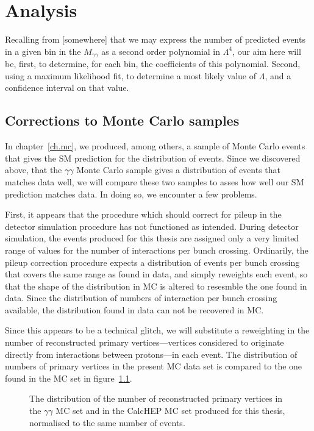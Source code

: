 \chapter{Analysis}\label{ch.an}

Recalling from [somewhere] that we may express the number of predicted events in a given bin in the $M_{\gamma\gamma}$ as a second order polynomial in $\Lambda^4$, our aim here will be, first, to determine, for each bin, the coefficients of this polynomial. Second, using a maximum likelihood fit, to determine a most likely value of $\Lambda$, and a confidence interval on that value.

\section{Corrections to Monte Carlo samples}

In chapter~\ref{ch.mc}, we produced, among others, a sample of Monte Carlo events that gives the SM prediction for the distribution of events. Since we discovered above, that the \atlas{} $\gamma\gamma$ Monte Carlo sample gives a distribution of events that matches data well, we will compare these two samples to asses how well our SM prediction matches data. In doing so, we encounter a few problems.

First, it appears that the procedure which should correct for pileup in the detector simulation procedure has not functioned as intended. During detector simulation, the events produced for this thesis are assigned only a very limited range of values for the number of interactions per bunch crossing. Ordinarily, the pileup correction procedure expects a distribution of events per bunch crossing that covers the same range as found in data, and simply reweights each event, so that the shape of the distribution in MC is altered to resesmble the one found in data. Since the distribution of numbers of interaction per bunch crossing available, the distribution found in data can not be recovered in MC.

Since this appears to be a technical glitch, we will substitute a reweighting in the number of reconstructed primary vertices---vertices considered to originate directly from interactions between protons---in each event. The distribution of numbers of primary vertices in the present MC data set is compared to the one found in the \atlas{} MC set in figure~\ref{pvnnone}.

\begin{figure}[htp]
\begin{minipage}[b]{.69\textwidth}
\begin{infilsf} \tiny

\end{infilsf}
\end{minipage}
\begin{minipage}[b]{.3\textwidth}
\caption{The distribution of the number of reconstructed primary vertices in the \atlas{} $\gamma\gamma$ MC set and in the CalcHEP MC set produced for this thesis, normalised to the same number of events.}\label{pvnnone}
\end{minipage}
\end{figure}


